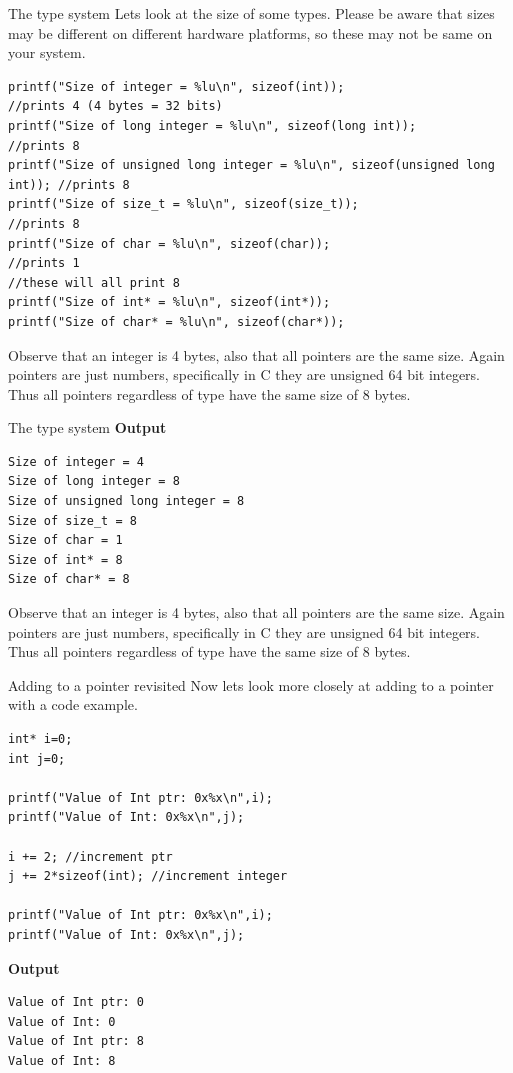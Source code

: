\documentclass{beamer}
\begin{document}
\begin{frame}[fragile]{The type system}
Lets look at the size of some types. Please be aware that sizes may be different on different hardware platforms, so these may not be same on your system.

\begin{verbatim}
printf("Size of integer = %lu\n", sizeof(int));                             //prints 4 (4 bytes = 32 bits)
printf("Size of long integer = %lu\n", sizeof(long int));                   //prints 8
printf("Size of unsigned long integer = %lu\n", sizeof(unsigned long int)); //prints 8
printf("Size of size_t = %lu\n", sizeof(size_t));                           //prints 8
printf("Size of char = %lu\n", sizeof(char));                               //prints 1
//these will all print 8
printf("Size of int* = %lu\n", sizeof(int*));
printf("Size of char* = %lu\n", sizeof(char*));
\end{verbatim}
Observe that an integer is 4 bytes, also that all pointers are the same size. Again pointers are just numbers, specifically in C they are unsigned 64 bit integers. Thus all pointers regardless of type have the same size of 8 bytes.
\end{frame}

\begin{frame}[fragile]{The type system}
{\bf Output}
\begin{verbatim}
Size of integer = 4
Size of long integer = 8
Size of unsigned long integer = 8
Size of size_t = 8
Size of char = 1
Size of int* = 8
Size of char* = 8
\end{verbatim}
Observe that an integer is 4 bytes, also that all pointers are the same size. Again pointers are just numbers, specifically in C they are unsigned 64 bit integers. Thus all pointers regardless of type have the same size of 8 bytes.
\end{frame}

\begin{frame}[fragile]{Adding to a pointer revisited}
Now lets look more closely at adding to a pointer with a code example.

\begin{verbatim}
int* i=0;
int j=0;

printf("Value of Int ptr: 0x%x\n",i);
printf("Value of Int: 0x%x\n",j);

i += 2; //increment ptr
j += 2*sizeof(int); //increment integer

printf("Value of Int ptr: 0x%x\n",i);
printf("Value of Int: 0x%x\n",j);
\end{verbatim}
{\bf Output}
\begin{verbatim}
Value of Int ptr: 0
Value of Int: 0
Value of Int ptr: 8
Value of Int: 8
\end{verbatim}
\end{frame}
\end{document}
